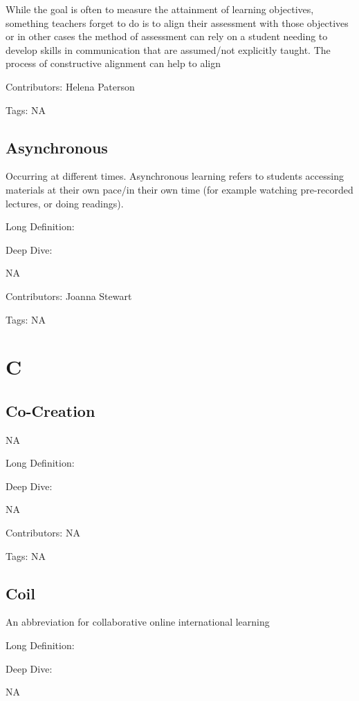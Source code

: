 \documentclass[
  letterpaper,
  DIV=11,
  numbers=noendperiod]{scrreprt}
\begin{document}
While the goal is often to measure the attainment of learning
objectives, something teachers forget to do is to align their assessment
with those objectives or in other cases the method of assessment can
rely on a student needing to develop skills in communication that are
assumed/not explicitly taught. The process of constructive alignment can
help to align

Contributors: Helena Paterson

Tags: NA

\section{Asynchronous}\label{asynchronous}

Occurring at different times. Asynchronous learning refers to students
accessing materials at their own pace/in their own time (for example
watching pre-recorded lectures, or doing readings).

Long Definition:

Deep Dive:

NA

Contributors: Joanna Stewart

Tags: NA


\chapter{C}\label{c}

\section{Co-Creation}\label{co-creation}

NA

Long Definition:

Deep Dive:

NA

Contributors: NA

Tags: NA

\section{Coil}\label{coil}

An abbreviation for collaborative online international learning

Long Definition:

Deep Dive:

NA
\end{document}
